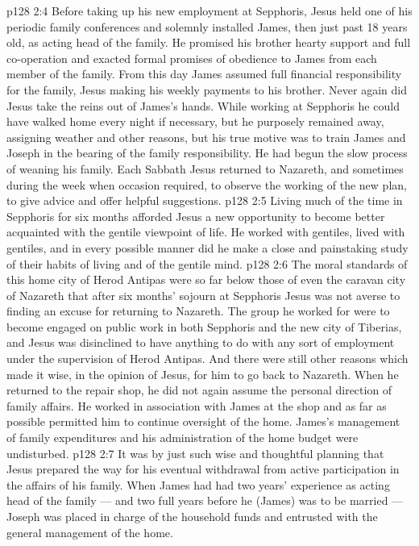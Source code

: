 \vs p128 2:4 \pc Before taking up his new employment at Sepphoris, Jesus held one of his periodic family conferences and solemnly installed James, then just past 18 years old, as acting head of the family. He promised his brother hearty support and full co\hyp{}operation and exacted formal promises of obedience to James from each member of the family. From this day James assumed full financial responsibility for the family, Jesus making his weekly payments to his brother. Never again did Jesus take the reins out of James’s hands. While working at Sepphoris he could have walked home every night if necessary, but he purposely remained away, assigning weather and other reasons, but his true motive was to train James and Joseph in the bearing of the family responsibility. He had begun the slow process of weaning his family. Each Sabbath Jesus returned to Nazareth, and sometimes during the week when occasion required, to observe the working of the new plan, to give advice and offer helpful suggestions.
\vs p128 2:5 \pc Living much of the time in Sepphoris for six months afforded Jesus a new opportunity to become better acquainted with the gentile viewpoint of life. He worked with gentiles, lived with gentiles, and in every possible manner did he make a close and painstaking study of their habits of living and of the gentile mind.
\vs p128 2:6 The moral standards of this home city of Herod Antipas were so far below those of even the caravan city of Nazareth that after six months’ sojourn at Sepphoris Jesus was not averse to finding an excuse for returning to Nazareth. The group he worked for were to become engaged on public work in both Sepphoris and the new city of Tiberias, and Jesus was disinclined to have anything to do with any sort of employment under the supervision of Herod Antipas. And there were still other reasons which made it wise, in the opinion of Jesus, for him to go back to Nazareth. When he returned to the repair shop, he did not again assume the personal direction of family affairs. He worked in association with James at the shop and as far as possible permitted him to continue oversight of the home. James’s management of family expenditures and his administration of the home budget were undisturbed.
\vs p128 2:7 It was by just such wise and thoughtful planning that Jesus prepared the way for his eventual withdrawal from active participation in the affairs of his family. When James had had two years’ experience as acting head of the family --- and two full years before he (James) was to be married --- Joseph was placed in charge of the household funds and entrusted with the general management of the home.
